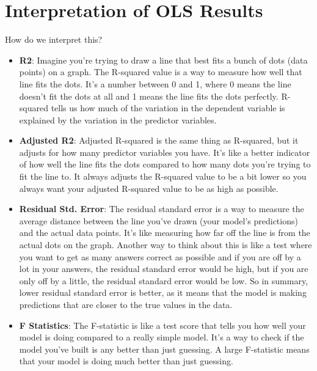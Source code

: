 \documentclass[
  letterpaper,
  DIV=11,
  numbers=noendperiod]{scrreprt}
\providecommand{\tightlist}{%
  \setlength{\itemsep}{0pt}\setlength{\parskip}{0pt}}\usepackage{longtable,booktabs,array}
\begin{document}
\hypertarget{interpretation-of-ols-results}{%
\section{Interpretation of OLS
Results}\label{interpretation-of-ols-results}}

How do we interpret this?

\begin{itemize}
\tightlist
\item
  \textbf{R2}: Imagine you're trying to draw a line that best fits a
  bunch of dots (data points) on a graph. The R-squared value is a way
  to measure how well that line fits the dots. It's a number between 0
  and 1, where 0 means the line doesn't fit the dots at all and 1 means
  the line fits the dots perfectly. R-squared tells us how much of the
  variation in the dependent variable is explained by the variation in
  the predictor variables.
\item
  \textbf{Adjusted R2}: Adjusted R-squared is the same thing as
  R-squared, but it adjusts for how many predictor variables you have.
  It's like a better indicator of how well the line fits the dots
  compared to how many dots you're trying to fit the line to. It always
  adjusts the R-squared value to be a bit lower so you always want your
  adjusted R-squared value to be as high as possible.
\item
  \textbf{Residual Std. Error}: The residual standard error is a way to
  measure the average distance between the line you've drawn (your
  model's predictions) and the actual data points. It's like measuring
  how far off the line is from the actual dots on the graph. Another way
  to think about this is like a test where you want to get as many
  answers correct as possible and if you are off by a lot in your
  answers, the residual standard error would be high, but if you are
  only off by a little, the residual standard error would be low. So in
  summary, lower residual standard error is better, as it means that the
  model is making predictions that are closer to the true values in the
  data.
\item
  \textbf{F Statistics}: The F-statistic is like a test score that tells
  you how well your model is doing compared to a really simple model.
  It's a way to check if the model you've built is any better than just
  guessing. A large F-statistic means that your model is doing much
  better than just guessing.
\end{itemize}
\end{document}

